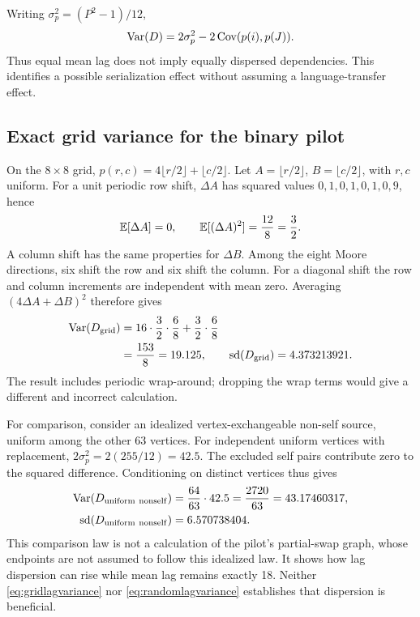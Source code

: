 Writing $\sigma_p^2=(P^2-1)/12$,
\begin{equation}
 \operatorname{Var}(D)=2\sigma_p^2-2\operatorname{Cov}(p(i),p(J)).
 \label{eq:lagvariance}
\end{equation}
Thus equal mean lag does not imply equally dispersed dependencies.
This identifies a possible serialization effect without assuming a
language-transfer effect.

\subsection{Exact grid variance for the binary pilot}

On the $8\times8$ grid,
$p(r,c)=4\lfloor r/2\rfloor+\lfloor c/2\rfloor$.
Let $A=\lfloor r/2\rfloor$, $B=\lfloor c/2\rfloor$, with $r,c$ uniform.
For a unit periodic row shift, $\Delta A$ has squared values
$0,1,0,1,0,1,0,9$, hence
\begin{equation}
 \mathbb{E}[\Delta A]=0,\qquad \mathbb{E}[(\Delta A)^2]=\frac{12}{8}=\frac32.
\end{equation}
A column shift has the same properties for $\Delta B$. Among the eight
Moore directions, six shift the row and six shift the column. For a
diagonal shift the row and column increments are independent with mean
zero. Averaging $(4\Delta A+\Delta B)^2$ therefore gives
\begin{align}
 \operatorname{Var}(D_{\rm grid})
 &=16\cdot\frac32\cdot\frac68
       +\frac32\cdot\frac68\\
 &=\frac{153}{8}=19.125,\qquad
 {\rm sd}(D_{\rm grid})=4.373213921.
 \label{eq:gridlagvariance}
\end{align}
The result includes periodic wrap-around; dropping the wrap terms would
give a different and incorrect calculation.

For comparison, consider an idealized vertex-exchangeable non-self
source, uniform among the other 63 vertices. For independent uniform
vertices with replacement, $2\sigma_p^2=2(255/12)=42.5$.
The excluded self pairs contribute zero to the squared difference.
Conditioning on distinct vertices thus gives
\begin{equation}
 \begin{aligned}
 \operatorname{Var}(D_{\rm uniform\ nonself})
 &=\frac{64}{63}\cdot42.5=\frac{2720}{63}
 =43.17460317,\\
 {\rm sd}(D_{\rm uniform\ nonself})&=6.570738404.
 \end{aligned}
 \label{eq:randomlagvariance}
\end{equation}
This comparison law is not a calculation of the pilot's partial-swap
graph, whose endpoints are not assumed to follow this idealized law.
It shows how lag dispersion can rise while mean lag remains exactly 18.
Neither \eqref{eq:gridlagvariance} nor \eqref{eq:randomlagvariance}
establishes that dispersion is beneficial.

